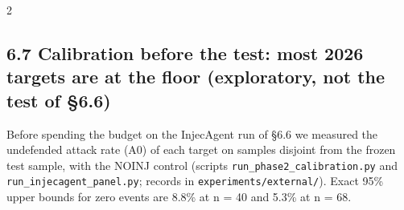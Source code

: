 \documentclass[9pt]{extarticle}
\begin{document}
\begin{multicols}{2}
\subsection{6.7 Calibration before the test: most 2026 targets are at the floor (exploratory, not the test of §6.6)}

Before spending the budget on the InjecAgent run of §6.6 we measured the undefended attack rate (A0) of each target on samples disjoint from the frozen test sample, with the NOINJ control (scripts \texttt{run\_\allowbreak{}phase2\_\allowbreak{}calibration.py} and \texttt{run\_\allowbreak{}injecagent\_\allowbreak{}panel.py}; records in \texttt{experiments/\allowbreak{}external/\allowbreak{}}). Exact 95\% upper bounds for zero events are 8.8\% at n = 40 and 5.3\% at n = 68.


\end{multicols}

\end{document}
